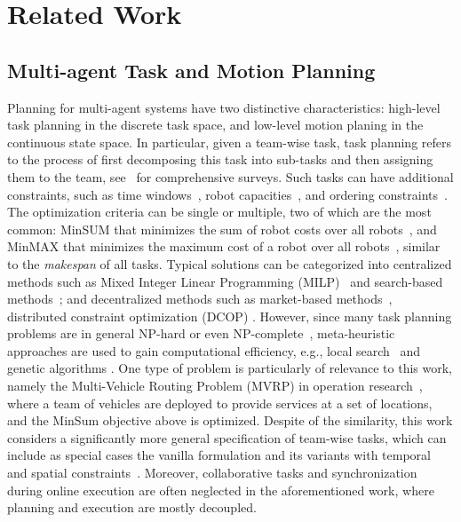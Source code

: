 \section{Related Work}\label{sec:related-work}




\subsection{Multi-agent Task and Motion Planning}\label{subsec:multi-tamp}
Planning for multi-agent systems have two distinctive characteristics:
high-level task planning in the discrete task space,
and low-level motion planing in the continuous state space.
In particular,
given a team-wise task, task planning refers to the process of first decomposing this task into sub-tasks
and then assigning them to the team, see~\cite{torreno2017cooperative,gini2017multi, khamis2015multi} for comprehensive surveys.
Such tasks can have additional constraints,
such as time windows~\cite{luo2015distributed}, robot capacities~\cite{fukasawa2006robust},
and ordering constraints~\cite{boerkoel2013distributed, nunes2015multi}.
The optimization criteria can be single or multiple,
two of which are the most common:
MinSUM that minimizes the sum of robot costs over all robots~\cite{gini2017multi, luo2015distributed, fukasawa2006robust},
and MinMAX that minimizes the maximum cost of a robot over all robots~\cite{nunes2015multi},
similar to the \emph{makespan} of all tasks.
Typical solutions can be categorized into centralized methods such as
Mixed Integer Linear Programming (MILP)~\cite{torreno2017cooperative} and search-based methods~\cite{fukasawa2006robust,FANG2022110228};
and decentralized methods such as
market-based methods~\cite{luo2015distributed}, distributed constraint optimization (DCOP) \cite{boerkoel2013distributed}.
However, since many task planning problems are in general NP-hard or even NP-complete~\cite{gini2017multi},
meta-heuristic approaches are used to gain computational efficiency,
e.g., local search~\cite{hoos2004stochastic} and genetic algorithms \cite{khamis2015multi}.
One type of problem is particularly of relevance to this work,
namely the Multi-Vehicle Routing Problem (MVRP) in operation research~\cite{gini2017multi, khamis2015multi},
where a team of vehicles are deployed to provide services at a set of locations,
and the MinSum objective above is optimized.
Despite of the similarity,
this work considers a significantly more general specification of team-wise tasks,
which can include as special cases the vanilla formulation and its variants with
temporal and spatial constraints~\cite{boerkoel2013distributed, nunes2015multi}.
Moreover, collaborative tasks and synchronization during online execution are often neglected in the aforementioned work, where planning and execution are mostly decoupled.

